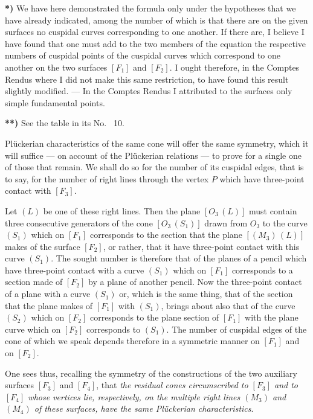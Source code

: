 \documentclass{article}
\begin{document}
\textbf{*)} We have here demonstrated the formula only under the hypotheses that we have already indicated, among the number of which is that there are on the given surfaces no cuspidal curves corresponding to one another. If there are, I believe I have found that one must add to the two members of the equation the respective numbers of cuspidal points of the cuspidal curves which correspond to one another on the two surfaces $[F_1]$ and $[F_2]$. I ought therefore, in the Comptes Rendus where I did not make this same restriction, to have found this result slightly modified. --- In the Comptes Rendus I attributed to the surfaces only simple fundamental points.

\textbf{**)} See the table in its No.~ 10.

Plückerian characteristics of the same cone will offer the same symmetry, which it will suffice --- on account of the Plückerian relations --- to prove for a single one of those that remain. We shall do so for the number of its cuspidal edges, that is to say, for the number of right lines through the vertex $P$ which have three-point contact with $[F_3]$.

Let $(L)$ be one of these right lines. Then the plane $[O_3\,(L)]$ must contain three consecutive generators of the cone $[O_3\,(S_1)]$ drawn from $O_3$ to the curve $(S_1)$ which on $[F_1]$ corresponds to the section that the plane $[(M_3)\,(L)]$ makes of the surface $[F_2]$, or rather, that it have three-point contact with this curve $(S_1)$. The sought number is therefore that of the planes of a pencil which have three-point contact with a curve $(S_1)$ which on $[F_1]$ corresponds to a section made of $[F_2]$ by a plane of another pencil. Now the three-point contact of a plane with a curve $(S_1)$ or, which is the same thing, that of the section that the plane makes of $[F_1]$ with $(S_1)$, brings about also that of the curve $(S_2)$ which on $[F_2]$ corresponds to the plane section of $[F_1]$ with the plane curve which on $[F_2]$ corresponds to $(S_1)$. The number of cuspidal edges of the cone of which we speak depends therefore in a symmetric manner on $[F_1]$ and on $[F_2]$.

One sees thus, recalling the symmetry of the constructions of the two auxiliary surfaces $[F_3]$ and $[F_4]$, that \emph{the residual cones circumscribed to $[F_3]$ and to $[F_4]$ whose vertices lie, respectively, on the multiple right lines $(M_3)$ and $(M_4)$ of these surfaces, have the same Plückerian characteristics}.
\end{document}

